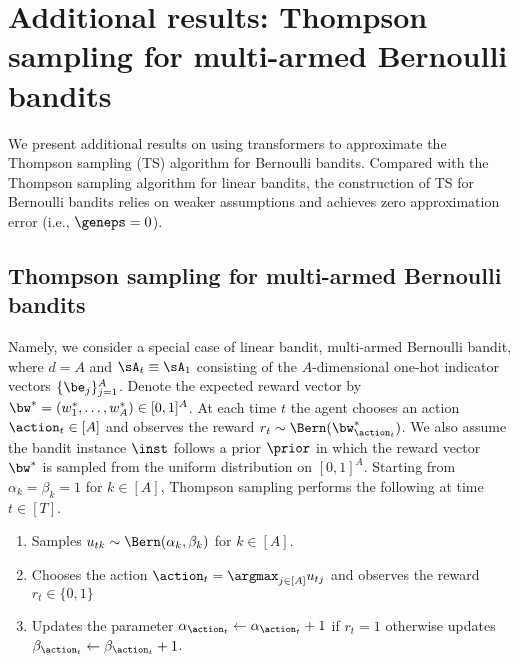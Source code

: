 \section{Additional results: Thompson sampling for multi-armed Bernoulli bandits}\label{example:ts-app}

We present additional results on using transformers to approximate the Thompson sampling (TS) algorithm for Bernoulli bandits. Compared with the Thompson sampling algorithm for linear bandits, the construction of TS for  Bernoulli bandits relies on weaker assumptions and achieves zero approximation error (i.e., $\geneps=0$).










\subsection{Thompson sampling for multi-armed Bernoulli bandits}
Namely, we consider a special case of linear bandit, multi-armed Bernoulli bandit,  where $d=A$ and $\sA_t\equiv\sA_1$ consisting  of the $A$-dimensional one-hot indicator vectors $\{\be_j\}_{j=1}^A$. Denote the expected reward vector by $\bw^*=(w^*_1,\ldots,w^*_A)\in[0,1]^A$. At each time $t$ the agent chooses an action $\action_t\in[A]$ and observes the reward $r_t\sim\Bern(\bw^*_{\action_t})$.   We also assume the bandit instance $\inst$ follows a prior $\prior$ in which the reward vector $\bw^*$ is sampled from the uniform distribution on $[0,1]^A$. 
Starting from $\alpha_{k}=\beta_{k}=1$ for $k\in[A]$, Thompson sampling performs the following at time $t\in[T]$.

\begin{enumerate}
    \item Samples $u_{tk}\sim\Bern(\alpha_{k},\beta_{k})$ for $k\in[A]$.
    \item Chooses the action $\action_t=\argmax_{j\in[A]}u_{tj}$ and observes the reward $r_t\in\{0,1\}$
    \item Updates the parameter $\alpha_{\action_t}\leftarrow\alpha_{\action_t}+1$ if $r_t=1$ otherwise updates $\beta_{\action_t}\leftarrow\beta_{\action_t}+1$.

\end{enumerate} 


